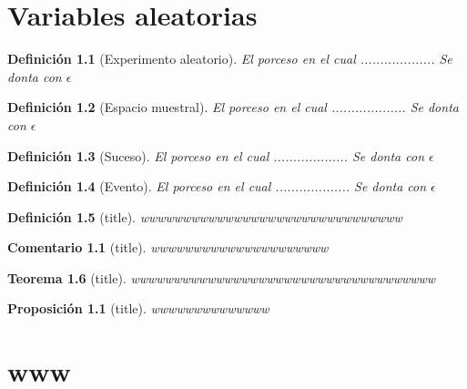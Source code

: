 \documentclass[a4paper]{report}
\newtheorem{rem}{Comentario}[chapter]
\newtheorem{thm}{Teorema}[chapter]
\newtheorem{defn}[thm]{Definición}
\newtheorem{prop}{Proposición}[thm]
\begin{document}
												\chapter{Variables aleatorias}
												\begin{defn}[Experimento aleatorio]
													El porceso en el cual ................... Se donta con $\epsilon$
												\end{defn}

												\begin{defn}[Espacio muestral]
													El porceso en el cual ................... Se donta con $\epsilon$
												\end{defn}
												\begin{defn}[Suceso]
													El porceso en el cual ................... Se donta con $\epsilon$
												\end{defn}

												\begin{defn}[Evento]
													El porceso en el cual ................... Se donta con $\epsilon$
												\end{defn}



												\begin{defn}[title]
													wwwwwwwwwwwwwwwwwwwwwwwwwwwwwww
												\end{defn}

												\begin{rem}[title]
													wwwwwwwwwwwwwwwwwwwww
												\end{rem}




												\begin{thm}[title]
													wwwwwwwwwwwwwwwwwwwwwwwwwwwwwwwwwwww
												\end{thm}

												\begin{prop}[title]
													wwwwwwwwwwwwww
												\end{prop}
												\chapter{www}
\end{document}
